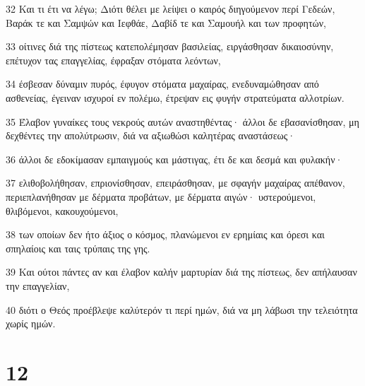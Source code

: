 \par 32 Και τι έτι να λέγω; Διότι θέλει με λείψει ο καιρός διηγούμενον περί Γεδεών, Βαράκ τε και Σαμψών και Ιεφθάε, Δαβίδ τε και Σαμουήλ και των προφητών,
\par 33 οίτινες διά της πίστεως κατεπολέμησαν βασιλείας, ειργάσθησαν δικαιοσύνην, επέτυχον τας επαγγελίας, έφραξαν στόματα λεόντων,
\par 34 έσβεσαν δύναμιν πυρός, έφυγον στόματα μαχαίρας, ενεδυναμώθησαν από ασθενείας, έγειναν ισχυροί εν πολέμω, έτρεψαν εις φυγήν στρατεύματα αλλοτρίων.
\par 35 Έλαβον γυναίκες τους νεκρούς αυτών αναστηθέντας· άλλοι δε εβασανίσθησαν, μη δεχθέντες την απολύτρωσιν, διά να αξιωθώσι καλητέρας αναστάσεως·
\par 36 άλλοι δε εδοκίμασαν εμπαιγμούς και μάστιγας, έτι δε και δεσμά και φυλακήν·
\par 37 ελιθοβολήθησαν, επριονίσθησαν, επειράσθησαν, με σφαγήν μαχαίρας απέθανον, περιεπλανήθησαν με δέρματα προβάτων, με δέρματα αιγών· υστερούμενοι, θλιβόμενοι, κακουχούμενοι,
\par 38 των οποίων δεν ήτο άξιος ο κόσμος, πλανώμενοι εν ερημίαις και όρεσι και σπηλαίοις και ταις τρύπαις της γης.
\par 39 Και ούτοι πάντες αν και έλαβον καλήν μαρτυρίαν διά της πίστεως, δεν απήλαυσαν την επαγγελίαν,
\par 40 διότι ο Θεός προέβλεψε καλύτερόν τι περί ημών, διά να μη λάβωσι την τελειότητα χωρίς ημών.

\chapter{12}

